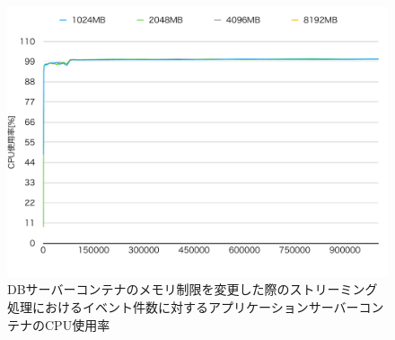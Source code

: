 \documentclass[../../../../../main]{subfiles}
\begin{document}
    \begin{figure}[H]
        \centering
        \includegraphics[width=12cm]{graph}
        \caption{DBサーバーコンテナのメモリ制限を変更した際のストリーミング処理におけるイベント件数に対するアプリケーションサーバーコンテナのCPU使用率}
        \label{fig:stream-change-db-memory-limit-app-cpu-app_4_8192-db_400}
    \end{figure}
\end{document}
